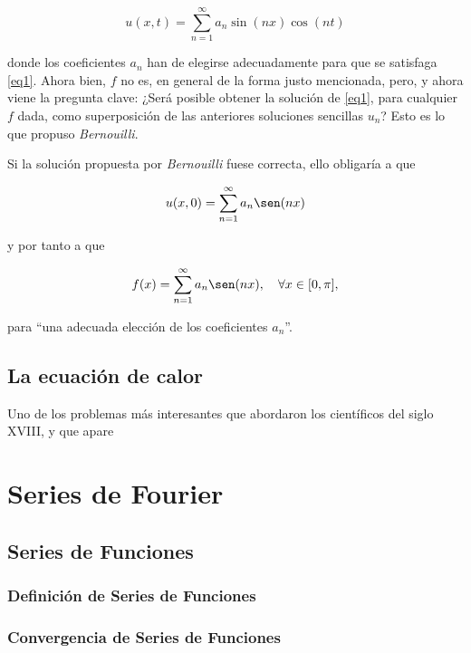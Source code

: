 \begin{equation}\label{eq4}
	u(x,t) = \sum_{n=1}^{\infty} a_n \sin(nx) \cos(nt)
\end{equation}
\newline

donde los coeficientes \( a_n \) han de elegirse adecuadamente para que se satisfaga
\ref{eq1}.
\newline
Ahora bien, \( f \) no es, en general de la forma justo mencionada, pero, y ahora 
viene la pregunta clave: ¿Será posible obtener la solución de \ref{eq1}, para cualquier 
\( f \) dada, como superposición de las anteriores soluciones sencillas \( u_n \)? Esto es
lo que propuso \textit{Bernouilli}.

Si la solución propuesta por \textit{Bernouilli} fuese correcta, ello obligaría a que

\begin{equation}\label{eq5}
	u(x, 0) = \sum_{n=1}^{\infty} a_n \sen(nx)
\end{equation}

y por tanto a que

\begin{equation}\label{eq6}
f(x) = \sum_{n=1}^{\infty} a_n \sen(nx), \quad \forall x \in [0, \pi],
\end{equation}

para “una adecuada elección de los coeficientes \( a_n \)”.


\subsection{La ecuación de calor}

Uno de los problemas más interesantes que abordaron los científicos del siglo XVIII, y que apare


\section{Series de Fourier}

\subsection{Series de Funciones}
\subsubsection{Definición de Series de Funciones}
\subsubsection{Convergencia de Series de Funciones}

